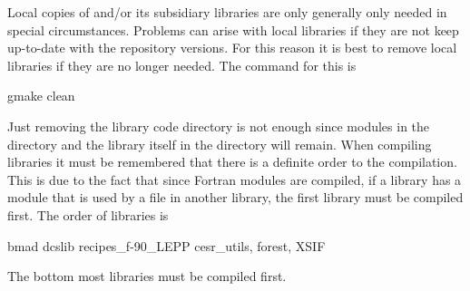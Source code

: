 Local copies of \bmad and/or its subsidiary libraries are only
generally only needed in special circumstances. Problems can arise
with local libraries if they are not keep up-to-date with the
repository versions. For this reason it is best to remove local
libraries if they are no longer needed. The command for this is
\begin{example}
  gmake clean
\end{example}
Just removing the library code directory is not enough since modules
in the  directory and the library itself in the 
directory will remain. When compiling libraries it must be remembered
that there is a definite order to the compilation. This is due to the
fact that since Fortran modules are compiled, if a library has a
module that is used by a file in another library, the first library
must be compiled first. The order of libraries is
\begin{example}
  bmad
  dcslib
  recipes_f-90_LEPP
  cesr_utils, forest, XSIF 
\end{example}
The bottom most libraries must be compiled first.
